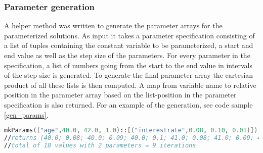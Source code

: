 \begin{table}[h!]
\centering
{}
\caption{Parameterized CalcSpec calculations per ms with double precision\label{table:cubaseGeneratedParamdoubletime}}
\end{table}
\subsubsection{Parameter generation}
A helper method was written to generate the parameter arrays for the parameterized solutions.
As input it takes a parameter specification consisting of a list of tuples containing the constant variable to be parameterized, a start and end value as well as the step size of the parameters.
For every parameter in the specification, a list of numbers going from the start to the end value in intervals of the step size is generated.
To generate the final parameter array the cartesian product of all these lists is then computed.
A map from variable name to relative position in the parameter array based on the list-position in the parameter specification is also returned.
For an example of the generation, see code sample \ref{gen_params}.

\begin{lstlisting}[language=fsharp, caption=Parameter generation with the age variable ranging from 40 to 42 and the interest rate variable ranging from 8\% to 10\%, label=gen_params]
mkParams(("age",40.0, 42.0, 1.0)::[("interestrate",0.08, 0.10, 0.01)])
//returns [40.0; 0.08; 40.0; 0.09; 40.0; 0.1; 41.0; 0.08; 41.0; 0.09; 41.0; 0.1; 42.0; 0.08; 42.0; 0.09; 42.0; 0.1]
//total of 18 values with 2 parameters = 9 iterations
\end{lstlisting}

